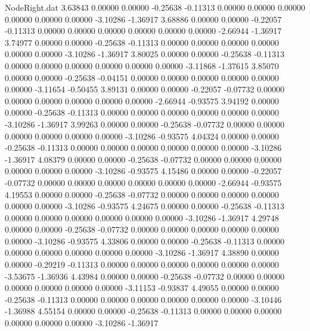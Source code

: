 \begin{filecontents}{NodeRight.dat}
   3.63843    0.00000    0.00000    -0.25638   -0.11313    0.00000    0.00000    0.00000    0.00000    0.00000    0.00000   -3.10286   -1.36917
   3.68886    0.00000    0.00000    -0.22057   -0.11313    0.00000    0.00000    0.00000    0.00000    0.00000    0.00000   -2.66944   -1.36917
   3.74977    0.00000    0.00000    -0.25638   -0.11313    0.00000    0.00000    0.00000    0.00000    0.00000    0.00000   -3.10286   -1.36917
   3.80025    0.00000    0.00000    -0.25638   -0.11313    0.00000    0.00000    0.00000    0.00000    0.00000    0.00000   -3.11868   -1.37615
   3.85070    0.00000    0.00000    -0.25638   -0.04151    0.00000    0.00000    0.00000    0.00000    0.00000    0.00000   -3.11654   -0.50455
   3.89131    0.00000    0.00000    -0.22057   -0.07732    0.00000    0.00000    0.00000    0.00000    0.00000    0.00000   -2.66944   -0.93575
   3.94192    0.00000    0.00000    -0.25638   -0.11313    0.00000    0.00000    0.00000    0.00000    0.00000    0.00000   -3.10286   -1.36917
   3.99263    0.00000    0.00000    -0.25638   -0.07732    0.00000    0.00000    0.00000    0.00000    0.00000    0.00000   -3.10286   -0.93575
   4.04324    0.00000    0.00000    -0.25638   -0.11313    0.00000    0.00000    0.00000    0.00000    0.00000    0.00000   -3.10286   -1.36917
   4.08379    0.00000    0.00000    -0.25638   -0.07732    0.00000    0.00000    0.00000    0.00000    0.00000    0.00000   -3.10286   -0.93575
   4.15486    0.00000    0.00000    -0.22057   -0.07732    0.00000    0.00000    0.00000    0.00000    0.00000    0.00000   -2.66944   -0.93575
   4.19553    0.00000    0.00000    -0.25638   -0.07732    0.00000    0.00000    0.00000    0.00000    0.00000    0.00000   -3.10286   -0.93575
   4.24675    0.00000    0.00000    -0.25638   -0.11313    0.00000    0.00000    0.00000    0.00000    0.00000    0.00000   -3.10286   -1.36917
   4.29748    0.00000    0.00000    -0.25638   -0.07732    0.00000    0.00000    0.00000    0.00000    0.00000    0.00000   -3.10286   -0.93575
   4.33806    0.00000    0.00000    -0.25638   -0.11313    0.00000    0.00000    0.00000    0.00000    0.00000    0.00000   -3.10286   -1.36917
   4.38890    0.00000    0.00000    -0.29219   -0.11313    0.00000    0.00000    0.00000    0.00000    0.00000    0.00000   -3.53675   -1.36936
   4.43984    0.00000    0.00000    -0.25638   -0.07732    0.00000    0.00000    0.00000    0.00000    0.00000    0.00000   -3.11153   -0.93837
   4.49055    0.00000    0.00000    -0.25638   -0.11313    0.00000    0.00000    0.00000    0.00000    0.00000    0.00000   -3.10446   -1.36988
   4.55154    0.00000    0.00000    -0.25638   -0.11313    0.00000    0.00000    0.00000    0.00000    0.00000    0.00000   -3.10286   -1.36917

\end{filecontents}
